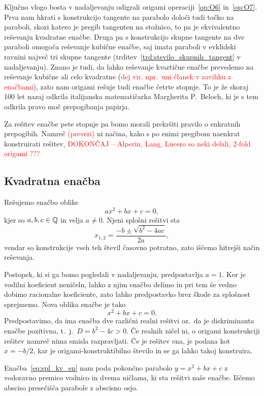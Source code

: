 Ključno vlogo bosta v nadaljevanju odigrali origami operaciji~\ref{op:O6} in~\ref{op:O7}. Prva nam hkrati s konstrukcijo tangente na parabolo določi tudi točko na paraboli, skozi katero je pregib tangenten na stožnico, to pa je ekvivalentno reševanju kvadratne enačbe. Druga pa s konstrukcijo skupne tangente na dve paraboli omogoča reševanje kubične enačbe, saj imata paraboli v evklidski ravnini največ tri skupne tangente (trditev~\ref{trd:stevilo_skupnih_tangent} v nadaljevanju). Znano je tudi, da lahko reševanje kvartične enačbe prevedemo na reševanje kubične ali celo kvadratne (\textcolor{red}{dej vir, npr.\ uni članek v zavihku z enačbami}), zato nam origami rešuje tudi enačbe četrte stopnje. To je že skoraj 100 let nazaj odkrila italijanska matematičarka Margherita P.\ Beloch, ki je s tem odkrila pravo moč prepogibanja papirja.

Za rešitev enačbe pete stopnje pa bomo morali prekršiti pravilo o enkratnih prepogibih. Namreč \textcolor{red}{(preveri)} ni načina, kako s po enimi pregibom naenkrat konstruirati rešitev, \textcolor{red}{DOKONČAJ -- Alperin, Lang, Lucero so neki delali, 2-fold origami ???}

\subsection{Kvadratna enačba}
\label{podpogl:kvadratna_enacba}

Rešujemo enačbo oblike
$$ a x^2 + b x + c = 0, $$
kjer so $a, b, c \in \mathbb Q$ in velja $a \neq 0$.  Njeni splošni rešitvi sta
$$ x_{1,2} = \frac{-b \pm \sqrt{b^2 - 4ac}}{2a},$$ vendar so konstrukcije vseh teh števil časovno potratno, zato iščemo hitrejši način reševanja.

Postopek, ki si ga bomo pogledali v nadaljevanju, predpostavlja $a = 1$. Ker je vodilni koeficient neničeln, lahko z njim enačbo delimo in pri tem še vedno dobimo racionalne koeficiente, zato lahko predpostavko brez škode za splošnost sprejmemo. Nova oblika enačbe je tako
\begin{equation}
    \label{eq:spl_kv_en}
    x^2 + bx + c = 0.
\end{equation}
Predpostavimo, da ima enačba dve različni realni rešitvi oz.\ da je diskriminanta enačbe pozitivna, t.\ j.\ $D = b^2 - 4c > 0$. Če realnih ničel ni, o origami konstrukciji rešitev namreč nima smisla razpravljati. Če je rešitev ena, je podana kot $x = -b/2$, kar je origami-konstruktibilno število in se ga lahko takoj konstruira.

Enačba~\ref{eq:spl_kv_en} nam poda pokončno parabolo $y = x^2 + bx + c$ z vodoravno premico vodnico in dvema ničlama, ki sta rešitvi naše enačbe. Iščemo absciso presečišča parabole z abscisno osjo.

